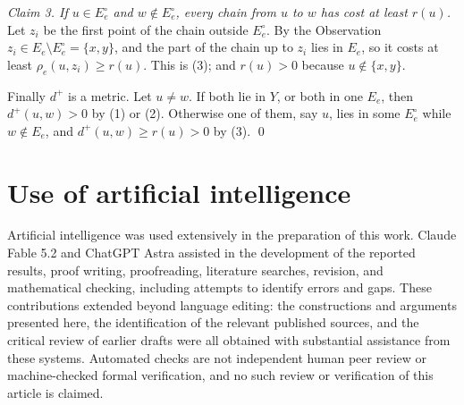 \documentclass[11pt]{amsart}
\theoremstyle{definition}
\theoremstyle{remark}
\numberwithin{equation}{section}
\begin{document}
\smallskip\noindent\emph{Claim 3. If $u\in E_e^\circ$ and $w\notin E_e^\circ$, every chain from $u$ to $w$ has cost at least $r(u)$.} Let $z_i$ be the first point of the chain outside $E_e^\circ$. By the Observation $z_i\in E_e\setminus E_e^\circ=\{x,y\}$, and the part of the chain up to $z_i$ lies in $E_e$, so it costs at least $\rho_e(u,z_i)\ge r(u)$. This is (3); and $r(u)>0$ because $u\notin\{x,y\}$.

\smallskip Finally $d^+$ is a metric. Let $u\ne w$. If both lie in $Y$, or both in one $E_e$, then $d^+(u,w)>0$ by (1) or (2). Otherwise one of them, say $u$, lies in some $E_e^\circ$ while $w\notin E_e$, and $d^+(u,w)\ge r(u)>0$ by (3). \qed

\section*{Use of artificial intelligence}
Artificial intelligence was used extensively in the preparation of this work. Claude Fable 5.2 and ChatGPT Astra assisted in the development of the reported results, proof writing, proofreading, literature searches, revision, and mathematical checking, including attempts to identify errors and gaps. These contributions extended beyond language editing: the constructions and arguments presented here, the identification of the relevant published sources, and the critical review of earlier drafts were all obtained with substantial assistance from these systems. Automated checks are not independent human peer review or machine-checked formal verification, and no such review or verification of this article is claimed.
\end{document}
